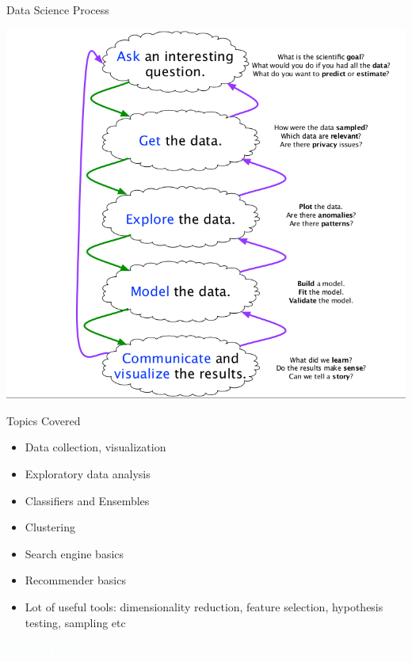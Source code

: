 \documentclass{beamer}
\newcommand{\thblue}[1]{{\Huge {\textcolor{azure}{#1}}}}
\begin{document}
\begin{frame}{Data Science Process}
    \begin{center}
        \includegraphics[scale=0.32]{dataScienceProcess.png}
    \end{center}
\end{frame}
\begin{frame}{Topics Covered}
    \begin{itemize}
        \item Data collection, visualization
        \item Exploratory data analysis
        \item Classifiers and Ensembles
        \item Clustering
        \item Search engine basics
        \item Recommender basics
        \item Lot of useful tools: dimensionality reduction, feature selection, hypothesis testing, sampling etc
    \end{itemize}
\end{frame}


\begin{frame}{}
    \begin{center}
        \thblue{Scientific Python}
    \end{center}
\end{frame}
\end{document}
